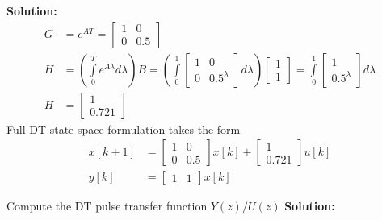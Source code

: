 \documentclass[twoside]{article}
\begin{document}
\textbf{Solution:}
\begin{align*}
  G &=  e^{A T} = \left[ 
\begin{array}{cc} 
             1 & 0 \\ 0 & 0.5
\end{array} \right] 
\\
H &=  \left( \int\limits_{0}^{T}
  e^{A \lambda } d \lambda \right) B
= \left( \int\limits_{0}^{1}
\left[ 
\begin{array}{cc} 
             1 & 0 \\ 0 & 0.5^{\lambda}
\end{array} \right] 
  d \lambda \right) \left[ \begin{array}{c} 1 \\ 1 \end{array} \right]
=
\int\limits_{0}^{1}
\left[ 
\begin{array}{c} 
             1  \\ 0.5^{\lambda}
\end{array} \right]  d \lambda
\\
H &= \left[ \begin{array}{c} 
             1  \\ 0.721
\end{array} \right]  
\end{align*}
Full DT state-space formulation takes the form
%
\begin{align*}
 x[k+1] &= \left[ \begin{array}{cc} 1 & 0 \\ 0 & 0.5 \end{array} \right] x[k]
    + \left[ \begin{array}{c} 1 \\ 0.721 \end{array} \right] u[k]
 \\
  y[k] &= \left[ \begin{array}{cc} 1 & 1 \end{array} \right] x[k]
\end{align*}

Compute the DT pulse transfer function $Y(z)/U(z)$
%
 \textbf{Solution:}
\end{document}
